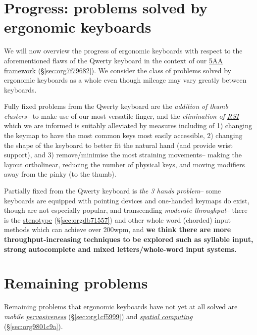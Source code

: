 \documentclass[logo,bsc,singlespacing,parskip]{infthesis}
\begin{document}
\section{Progress: problems solved by ergonomic keyboards}
\label{sec:org50e6363}
We will now overview the progress of ergonomic keyboards with respect to the aforementioned flaws of the Qwerty keyboard in the context of our \hyperref[sec:org7f79682]{5AA framework} (\S  \ref{sec:org7f79682}).
We consider the class of problems solved by ergonomic keyboards as a whole even though mileage may vary greatly between keyboards.

Fully fixed problems from the Qwerty keyboard are the \emph{addition of thumb clusters}-- to make use of our most versatile finger,  and the \emph{elimination of \hyperref[org77f0234]{RSI}} which we are informed is suitably alleviated by measures including of 1) changing the keymap to have the most common keys most easily accessible, 2) changing the shape of the keyboard to better fit the natural hand (and provide wrist support), and 3) remove/minimise the most straining movements-- making the layout ortholinear, reducing the number of physical keys, and moving modifiers away from the pinky (to the thumb).

Partially fixed from the Qwerty keyboard is \emph{the 3 hands problem}-- some keyboards are equipped with pointing devices and one-handed keymaps do exist, though are not especially popular, and transcending \emph{moderate throughput}-- there is the  \hyperref[sec:orgdb71557]{stenotype} (\S  \ref{sec:orgdb71557}) and other whole word (chorded) input methods which can achieve over 200wpm, and \textbf{we think there are more throughput-increasing techniques to be explored such as syllable input, strong autocomplete and mixed letters/whole-word input systems.}

\section{Remaining problems}
\label{sec:org9b6e67d}
Remaining problems that ergonomic keyboards have not yet at all solved are \emph{mobile \hyperref[sec:org1cf5999]{pervasiveness}} (\S  \ref{sec:org1cf5999}) and \emph{\hyperref[sec:org9801c9a]{spatial computing}} (\S  \ref{sec:org9801c9a}).
\end{document}
